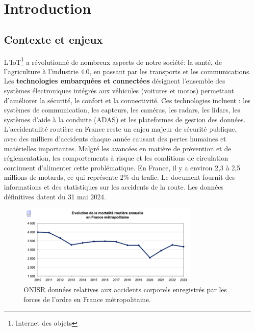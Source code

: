 \section{Introduction}
\subsection{Contexte et enjeux}
L'IoT\footnote{Internet des objets} a révolutionné de nombreux aspects de notre société: la santé, de l'agriculture à l'industrie 4.0, en passant par les transports et les communications.
Les \textbf{technologies embarquées et connectées} désignent l’ensemble des systèmes électroniques intégrés aux véhicules (voitures et motos) permettant d’améliorer la sécurité, le confort et la connectivité. Ces technologies incluent : les systèmes de communication, les capteurs, les caméras, les radars, les lidars, les systèmes d’aide à la conduite (ADAS) et les plateformes de gestion des données.\\
L’accidentalité routière en France reste un enjeu majeur de sécurité publique, avec des milliers d’accidents chaque année causant des pertes humaines et matérielles importantes. Malgré les avancées en matière de prévention et de réglementation, les comportements à risque et les conditions de circulation continuent d’alimenter cette problématique.
En France, il y a environ 2,3 à 2,5 millions de motards\cite{actiEouteNbMotardFr}, ce qui représente 2\%  du trafic.
Le document\cite{la_securite_routiere_accidentalite_2024} fournit des informations et des statistiques sur les accidents de la route. Les données définitives datent du 31 mai 2024.

\begin{figure}[h]
    \centering
    \includegraphics[width=0.8\textwidth]{images/evolution_mortalite_securite_routiere_france.png} 
    \caption{ONISR données relatives aux accidents corporels enregistrés par les forces de l'ordre en France métropolitaine.}
\end{figure}

